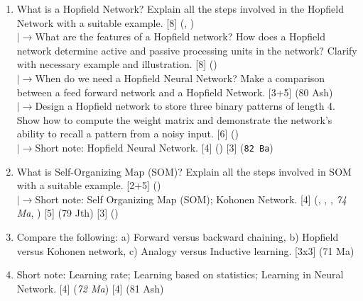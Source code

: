 \documentclass[12pt]{article}
\newcommand{\lb}{\\$\left|\rightarrow\right.$}
\begin{document}
\begin{enumerate}[topsep=0pt, noitemsep]
      \item What is a Hopfield Network? Explain all the steps involved in the Hopfield Network with a suitable example. \hfill [8] (, )
        \lb What are the features of a Hopfield network? How does a Hopfield network determine active and passive processing units in the network? Clarify with necessary example and illustration. \hfill [8] ()
        \lb When do we need a Hopfield Neural Network? Make a comparison between a feed forward network and a Hopfield Network. \hfill [3+5] (80 Ash)
        \lb Design a Hopfield network to store three binary patterns of length 4. Show how to compute the weight matrix and demonstrate the network's ability to recall a pattern from a noisy input. \hfill [6] ()
        \lb Short note: Hopfield Neural Network. \hfill [4] () [3] (\texttt{82 Ba})

      \item What is Self-Organizing Map (SOM)? Explain all the steps involved in SOM with a suitable example. \hfill [2+5] ()
        \lb Short note: Self Organizing Map (SOM); Kohonen Network. \hfill [4] (, , , \textit{74 Ma}, ) [5] (79 Jth) [3] ()

      \item Compare the following: a) Forward versus backward chaining, b) Hopfield versus Kohonen network, c) Analogy versus Inductive learning. \hfill [3x3] (71 Ma)

      \item Short note: Learning rate; Learning based on statistics; Learning in Neural Network. \hfill [4] (\textit{72 Ma}) [4] (81 Ash)
    \end{enumerate}
\end{document}
